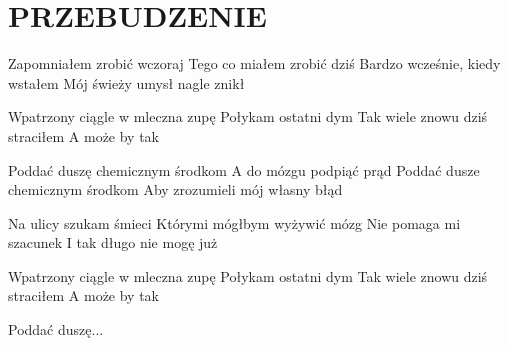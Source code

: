 \documentclass[../../../songbook.tex]{subfiles}
\begin{document}
\TabPositions{8cm} %
\section*{PRZEBUDZENIE}
{}
\vspace{0.5cm}
Zapomniałem zrobić wczoraj  \newline	
Tego co miałem zrobić dziś  \newline	
Bardzo wcześnie, kiedy wstałem	 \newline	  
Mój świeży umysł nagle znikł	  \newline		  

Wpatrzony ciągle w mleczna zupę			\newline	  
Połykam ostatni dym			\newline	  
Tak wiele znowu dziś straciłem			\newline	  
A może by tak			\newline	  

\-\hspace{1cm} Poddać duszę chemicznym środkom   \newline	
\-\hspace{1cm} A do mózgu podpiąć prąd			 \newline	  
\-\hspace{1cm} Poddać dusze chemicznym środkom	 \newline		  
\-\hspace{1cm} Aby zrozumieli mój własny błąd  \newline
	
Na ulicy szukam śmieci			\newline	  
Którymi mógłbym wyżywić mózg			\newline	  
Nie pomaga mi szacunek			\newline	  
I tak długo nie mogę już			\newline	  

Wpatrzony ciągle w mleczna zupę			\newline	  
Połykam ostatni dym			\newline	  
Tak wiele znowu dziś straciłem			\newline	  
A może by tak			\newline	  

\-\hspace{1cm} Poddać duszę...			\newline	  
\end{document}
